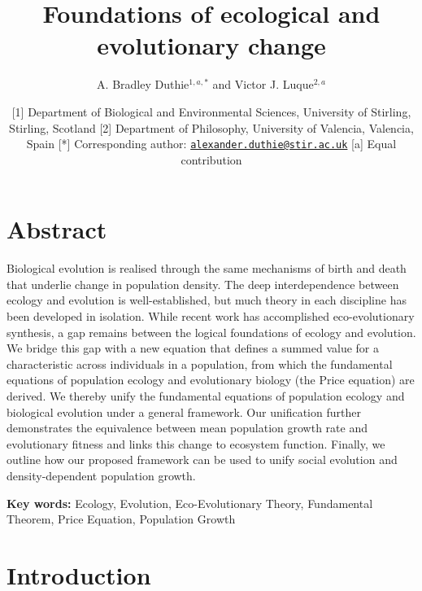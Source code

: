 \documentclass[
]{article}
\title{Foundations of ecological and evolutionary change}
\author{A. Bradley Duthie\(^{1,a,*}\) and Victor J. Luque\(^{2,a}\)}
\date{{[}1{]} Department of Biological and Environmental Sciences,
University of Stirling, Stirling, Scotland {[}2{]} Department of
Philosophy, University of Valencia, Valencia, Spain {[}*{]}
Corresponding author:
\href{mailto:alexander.duthie@stir.ac.uk}{\nolinkurl{alexander.duthie@stir.ac.uk}}
{[}a{]} Equal contribution}
\begin{document}
\maketitle

\section{Abstract}\label{abstract}

Biological evolution is realised through the same mechanisms of birth
and death that underlie change in population density. The deep
interdependence between ecology and evolution is well-established, but
much theory in each discipline has been developed in isolation. While
recent work has accomplished eco-evolutionary synthesis, a gap remains
between the logical foundations of ecology and evolution. We bridge this
gap with a new equation that defines a summed value for a characteristic
across individuals in a population, from which the fundamental equations
of population ecology and evolutionary biology (the Price equation) are
derived. We thereby unify the fundamental equations of population
ecology and biological evolution under a general framework. Our
unification further demonstrates the equivalence between mean population
growth rate and evolutionary fitness and links this change to ecosystem
function. Finally, we outline how our proposed framework can be used to
unify social evolution and density-dependent population growth.

\textbf{Key words:} Ecology, Evolution, Eco-Evolutionary Theory,
Fundamental Theorem, Price Equation, Population Growth

\section{Introduction}\label{introduction}
\end{document}
